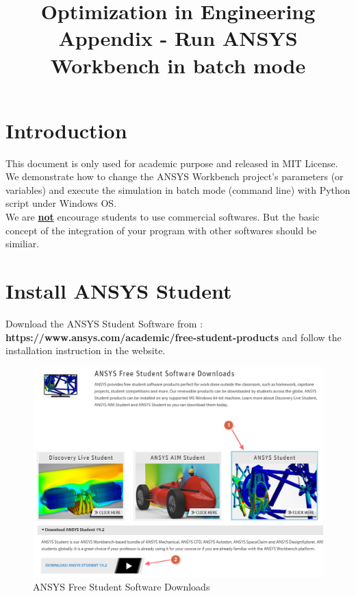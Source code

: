 \documentclass[12pt]{kjleehw}
\begin{document}
\begin{CJK}{UTF8}{bkai} 
\title{\textbf{Optimization in Engineering \\ Appendix - Run ANSYS Workbench in batch mode}}


\section{Introduction}

This document is only used for academic purpose and released in MIT License. We demonstrate how to change the ANSYS Workbench project's parameters (or variables) and execute the simulation in batch mode (command line) with Python script under Windows OS.\\

We are \underline{\textbf{not}} encourage students to use commercial softwares. But the basic concept of the integration of your program with other softwares should be similiar.

\section{Install ANSYS Student}

Download the ANSYS Student Software from : \textbf{https://www.ansys.com/academic/free-student-products} and follow the installation instruction in the website.

\begin{figure}[h]
	\centering
	\includegraphics[scale=0.4]{figure/download_ansys.png}
	\caption{ANSYS Free Student Software Downloads}
	\label{fig:download_ansys}
\end{figure}


\end{CJK}
\end{document}
